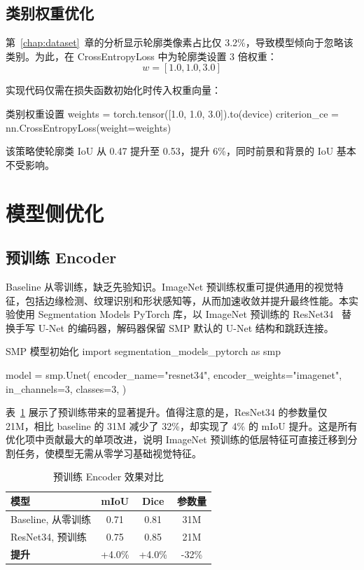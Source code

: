 \subsection{类别权重优化}

第~\ref{chap:dataset}~章的分析显示轮廓类像素占比仅 3.2\%，导致模型倾向于忽略该类别。为此，在 CrossEntropyLoss 中为轮廓类设置 3 倍权重：
\begin{equation}
    w = [1.0, 1.0, 3.0]
\end{equation}

实现代码仅需在损失函数初始化时传入权重向量：

\begin{codeblock}{类别权重设置}
weights = torch.tensor([1.0, 1.0, 3.0]).to(device)
criterion_ce = nn.CrossEntropyLoss(weight=weights)
\end{codeblock}

该策略使轮廓类 IoU 从 0.47 提升至 0.53，提升 6\%，同时前景和背景的 IoU 基本不受影响。

\section{模型侧优化}

\subsection{预训练 Encoder}

Baseline 从零训练，缺乏先验知识。ImageNet 预训练权重可提供通用的视觉特征，包括边缘检测、纹理识别和形状感知等，从而加速收敛并提升最终性能。本实验使用 Segmentation Models PyTorch 库，以 ImageNet 预训练的 ResNet34~\cite{he2016deep} 替换手写 U-Net 的编码器，解码器保留 SMP 默认的 U-Net 结构和跳跃连接。

\begin{codeblock}{SMP 模型初始化}
import segmentation_models_pytorch as smp

model = smp.Unet(
    encoder_name="resnet34",
    encoder_weights="imagenet",
    in_channels=3,
    classes=3,
)
\end{codeblock}

表~\ref{tab:pretrained_results} 展示了预训练带来的显著提升。值得注意的是，ResNet34 的参数量仅 21M，相比 baseline 的 31M 减少了 32\%，却实现了 4\% 的 mIoU 提升。这是所有优化项中贡献最大的单项改进，说明 ImageNet 预训练的低层特征可直接迁移到分割任务，使模型无需从零学习基础视觉特征。

\begin{table}[H]
    \centering
    \caption{预训练 Encoder 效果对比}
    \label{tab:pretrained_results}
    \begin{tabularx}{\textwidth}{Xccc}
        \hline
        \textbf{模型} & \textbf{mIoU} & \textbf{Dice} & \textbf{参数量} \\
        \hline
        Baseline, 从零训练 & 0.71 & 0.81 & 31M \\
        ResNet34, 预训练 & 0.75 & 0.85 & 21M \\
        \hline
        \textbf{提升} & +4.0\% & +4.0\% & -32\% \\
        \hline
    \end{tabularx}
\end{table}

